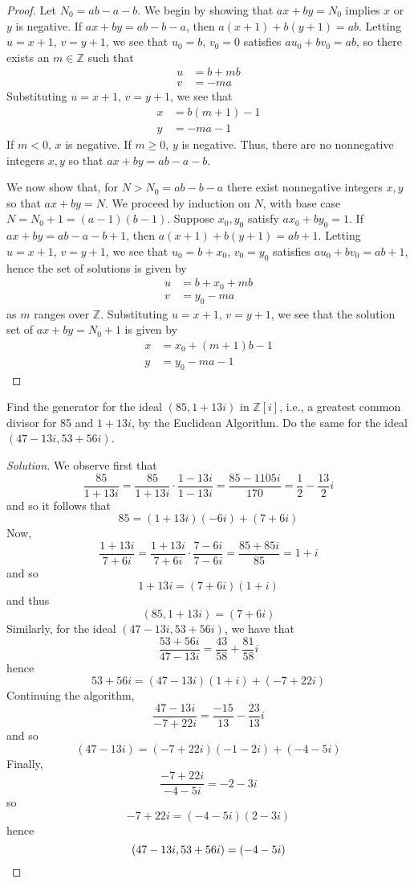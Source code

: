 \documentclass[12pt,leqno]{book}
\numberwithin{equation}{section}
\newcommand{\question}[2] {\vspace{.25in}\noindent\fbox{#1} #2 \vspace{.10in}}
\theoremstyle{definition}
\begin{document}
\begin{proof}
 Let $N_0=ab-a-b$. We begin by showing that $ax+by=N_0$ implies $x$ or $y$ is negative. If $ax+by=ab-b-a$, then $a(x+1)+b(y+1)=ab$. Letting $u=x+1$, $v=y+1$, we see that $u_0=b$, $v_0=0$ satisfies $au_0+bv_0=ab$, so there exists an $m\in\mathbb{Z}$ such that \begin{align*}u&=b+mb\\v&=-ma\end{align*} Substituting $u=x+1$, $v=y+1$, we see that \begin{align*}x&=b(m+1)-1\\y&=-ma-1\end{align*} If $m<0$, $x$ is negative. If $m\geq0$, $y$ is negative. Thus, there are no nonnegative integers $x,y$ so that $ax+by=ab-a-b$. 

We now show that, for $N>N_0=ab-b-a$ there exist nonnegative integers $x,y$ so that $ax+by=N$. We proceed by induction on $N$, with base case \linebreak$N=N_0+1=(a-1)(b-1)$. Suppose $x_0,y_0$ satisfy $ax_0+by_0=1$. If $ax+by=ab-a-b+1$, then $a(x+1)+b(y+1)=ab+1$. Letting $u=x+1$, $v=y+1$, we see that $u_0=b+x_0$, $v_0=y_0$ satisfies $au_0+bv_0=ab+1$, hence the set of solutions is given by \begin{align*}u&=b+x_0+mb\\v&=y_0-ma\end{align*} as $m$ ranges over $\mathbb{Z}$. Substituting $u=x+1$, $v=y+1$, we see that the solution set of $ax+by=N_0+1$ is given by \begin{align*}x&=x_0+(m+1)b-1\\y&=y_0-ma-1\end{align*} 
\end{proof}

\question{7}{Find the generator for the ideal $(85,1+13i)$ in $\mathbb{Z}[i]$, i.e., a greatest common divisor for 85 and $1+13i$, by the Euclidean Algorithm. Do the same for the ideal $(47-13i,53+56i)$.}

\begin{proof}[Solution]
We observe first that \[\frac{85}{1+13i}=\frac{85}{1+13i}\cdot\frac{1-13i}{1-13i}=\frac{85-1105i}{170}=\frac{1}{2}-\frac{13}{2}i\] and so it follows that \[85=(1+13i)(-6i)+(7+6i)\] Now, \[\frac{1+13i}{7+6i}=\frac{1+13i}{7+6i}\cdot\frac{7-6i}{7-6i}=\frac{85+85i}{85}=1+i\] and so \[1+13i=(7+6i)(1+i)\] and thus \[(85,1+13i)=(7+6i)\] Similarly, for the ideal $(47-13i,53+56i)$, we have that \[\frac{53+56i}{47-13i}=\frac{43}{58}+\frac{81}{58}i\] hence \[53+56i=(47-13i)(1+i)+(-7+22i)\] Continuing the algorithm, \[\frac{47-13i}{-7+22i}=\frac{-15}{13}-\frac{23}{13}i\] and so \[(47-13i)=(-7+22i)(-1-2i)+(-4-5i)\] Finally, \[\frac{-7+22i}{-4-5i}=-2-3i\] so \[-7+22i=(-4-5i)(2-3i)\] hence \[(47-13i,53+56i)=(-4-5i)\qedhere\]
\end{proof}
\end{document}
